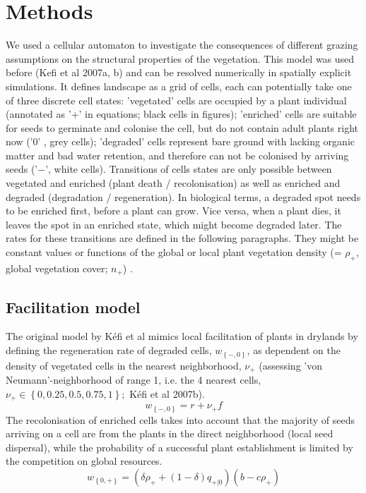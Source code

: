 \section{Methods}
We used a cellular automaton to investigate the consequences of different grazing assumptions on the structural properties of the vegetation. This model was used before (Kefi et al 2007a, b) and can be resolved numerically in spatially explicit simulations. It defines landscape as a grid of cells, each can potentially take one of three discrete cell states: 'vegetated' cells are occupied by a plant individual (annotated as '+' in equations; black cells in figures); 'enriched' cells are suitable for seeds to germinate and colonise the cell, but do not contain adult plants right now  ('0' , grey cells); 'degraded' cells represent bare ground with lacking organic matter and bad water retention, and therefore can not be colonised by arriving seeds  ('$-$', white cells).
Transitions of cells states are only possible between vegetated and enriched (plant death / recolonisation) as well as enriched and degraded (degradation / regeneration). In biological terms, a degraded spot needs to be enriched first, before a plant can grow. Vice versa, when a plant dies, it leaves the spot in an enriched state, which might become degraded later. The rates for these transitions are defined in the following paragraphs. They might be constant values or functions of the global or local plant vegetation density (= $\rho_+$, global vegetation cover; $n_+$) .

\subsection{Facilitation model}
The original model by K\'efi et al mimics local facilitation of plants in drylands by defining the regeneration rate of degraded cells, $w_{ \left\{-,0 \right\} }$, as dependent on the density of vegetated cells in the nearest neighborhood, $\nu_+$ (assessing 'von Neumann'-neighborhood of range 1, i.e. the 4 nearest cells, $\nu_+ \in \left\{ 0, 0.25, 0.5, 0.75, 1 \right\}; $ K\'efi et al 2007b).
\begin{equation}
	w_{ \left\{-,0 \right\} } = r + \nu_{+} f
\end{equation}
The recolonisation of enriched cells takes into account that the majority of seeds arriving on a cell are from the plants in the direct neighborhood (local seed dispersal), while the probability of a successful plant establishment is limited by the competition on global resources.
\begin{equation}
	w_{ \left\{0,+ \right\} } = \left( \delta\rho_+ + \left( 1 - \delta \right)q_{+|0}\right) \left(b-c\rho_+ \right)
\end{equation}

